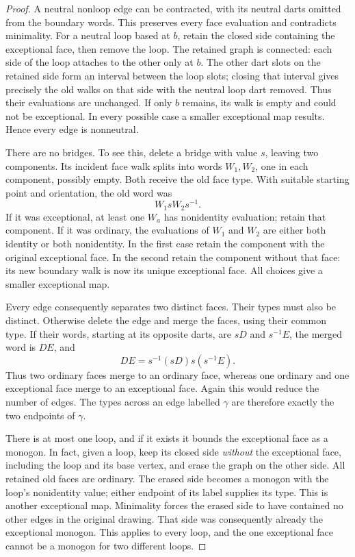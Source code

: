 \begin{proof}
A neutral nonloop edge can be contracted, with its neutral darts
omitted from the boundary words.  This preserves every face evaluation
and contradicts minimality.  For a neutral loop based at $b$, retain
the closed side containing the exceptional face, then remove the loop.
The retained graph is connected: each side of the loop attaches to the
other only at $b$.  The other dart slots on the retained side form an
interval between the loop slots; closing that interval gives precisely
the old walks on that side with the neutral loop dart removed.  Thus
their evaluations are unchanged.  If only $b$ remains, its walk is empty
and could not be exceptional.  In every possible case a smaller
exceptional map results.  Hence every edge is nonneutral.

There are no bridges.  To see this, delete a bridge with value $s$,
leaving two components.  Its incident face walk splits into words
$W_1,W_2$, one in each component, possibly empty.  Both receive the
old face type.  With suitable starting point and orientation, the old
word was
\[
 W_1sW_2s^{-1}.
\]
If it was exceptional, at least one $W_a$ has nonidentity evaluation;
retain that component.  If it was ordinary, the evaluations of $W_1$
and $W_2$ are either both identity or both nonidentity.  In the first
case retain the component with the original exceptional face.  In the
second retain the component without that face: its new boundary walk
is now its unique exceptional face.  All choices give a smaller
exceptional map.

Every edge consequently separates two distinct faces.  Their types
must also be distinct.  Otherwise delete the edge and merge the faces,
using their common type.  If their words, starting at its opposite
darts, are $sD$ and $s^{-1}E$, the merged word is $DE$, and
\begin{equation}\label{eq:gluing-merge}
 DE=s^{-1}(sD)s(s^{-1}E).
\end{equation}
Thus two ordinary faces merge to an ordinary face, whereas one ordinary
and one exceptional face merge to an exceptional face.  Again this
would reduce the number of edges.  The types across an edge labelled
$\gamma$ are therefore exactly the two endpoints of $\gamma$.

There is at most one loop, and if it exists it bounds the exceptional
face as a monogon.  In fact, given a loop, keep its closed side
\emph{without} the exceptional face, including the loop and its base
vertex, and erase the graph on the other side.  All retained old faces
are ordinary.  The erased side becomes a monogon with the loop's
nonidentity value; either endpoint of its label supplies its type.
This is another exceptional map.  Minimality forces the erased side
to have contained no other edges in the original drawing.  That side
was consequently already the exceptional monogon.  This applies to
every loop, and the one exceptional face cannot be a monogon for two
different loops.


\end{proof}
